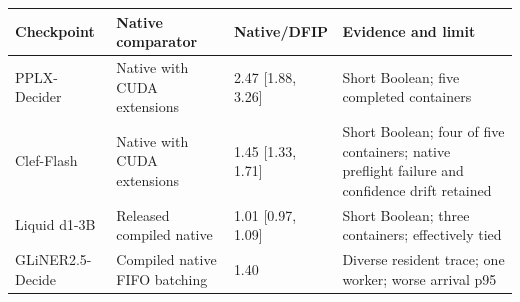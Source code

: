 \begin{tabular}{p{}p{}p{}p{}}
\toprule
Checkpoint & Native comparator & Native/DFIP & Evidence and limit \\
\midrule
PPLX-Decider & Native with CUDA extensions & 2.47 [1.88, 3.26] & Short Boolean; five completed containers \\
Clef-Flash & Native with CUDA extensions & 1.45 [1.33, 1.71] & Short Boolean; four of five containers; native preflight failure and confidence drift retained \\
Liquid d1-3B & Released compiled native & 1.01 [0.97, 1.09] & Short Boolean; three containers; effectively tied \\
GLiNER2.5-Decide & Compiled native FIFO batching & 1.40 & Diverse resident trace; one worker; worse arrival p95 \\
\bottomrule
\end{tabular}
